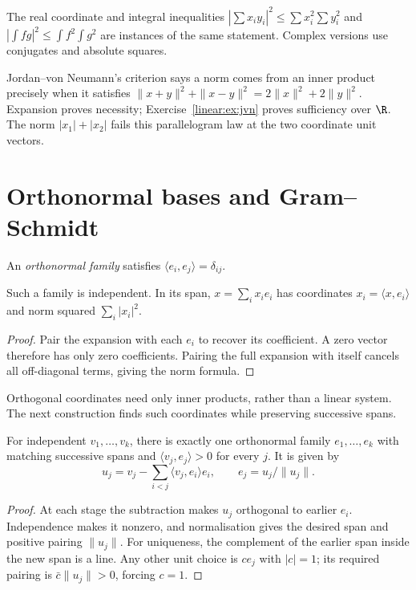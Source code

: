 The real coordinate and integral inequalities $|\sum x_iy_i|^2\le\sum x_i^2\sum y_i^2$ and $|\int fg|^2\le\int f^2\int g^2$ are instances of the same statement. Complex versions use conjugates and absolute squares.

\begin{remark}
Jordan--von Neumann's criterion says a norm comes from an inner product precisely when it satisfies $\|x+y\|^2+\|x-y\|^2=2\|x\|^2+2\|y\|^2$. Expansion proves necessity; Exercise~\ref{linear:ex:jvn} proves sufficiency over $\R$. The norm $|x_1|+|x_2|$ fails this parallelogram law at the two coordinate unit vectors.
\end{remark}

\section{Orthonormal bases and Gram--Schmidt}

An \emph{orthonormal family} satisfies $\langle e_i,e_j\rangle=\delta_{ij}$.
\begin{proposition}\label{linear:prop:orthfamily}
Such a family is independent. In its span, $x=\sum_ix_ie_i$ has coordinates $x_i=\langle x,e_i\rangle$ and norm squared $\sum_i|x_i|^2$.
\end{proposition}
\begin{proof}
Pair the expansion with each $e_i$ to recover its coefficient. A zero vector therefore has only zero coefficients. Pairing the full expansion with itself cancels all off-diagonal terms, giving the norm formula.
\end{proof}

Orthogonal coordinates need only inner products, rather than a linear system. The next construction finds such coordinates while preserving successive spans.

\begin{theorem}\label{linear:thm:gramschmidt}
For independent $v_1,\ldots,v_k$, there is exactly one orthonormal family $e_1,\ldots,e_k$ with matching successive spans and $\langle v_j,e_j\rangle>0$ for every $j$. It is given by
\[u_j=v_j-\sum_{i<j}\langle v_j,e_i\rangle e_i,\qquad e_j=u_j/\|u_j\|.\]
\end{theorem}
\begin{proof}
At each stage the subtraction makes $u_j$ orthogonal to earlier $e_i$. Independence makes it nonzero, and normalisation gives the desired span and positive pairing $\|u_j\|$. For uniqueness, the complement of the earlier span inside the new span is a line. Any other unit choice is $ce_j$ with $|c|=1$; its required pairing is $\bar c\|u_j\|>0$, forcing $c=1$.
\end{proof}

